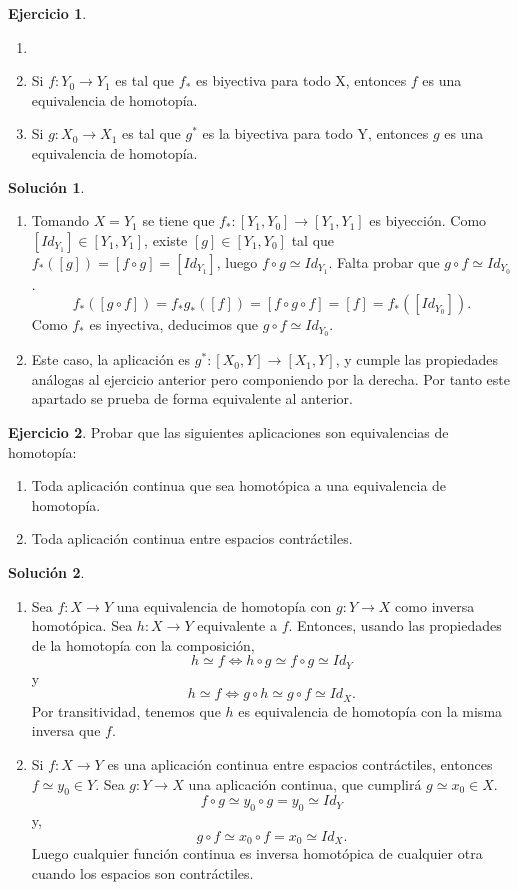\documentclass{article}
\theoremstyle{plain}
\theoremstyle{definition}
\newtheorem{exercise}{Ejercicio}
\newtheorem*{sol*}{Solución}
\begin{document}
\newpage
\begin{exercise}
\begin{enumerate}
\item[]
\item Si $f:Y_0\to Y_1$ es tal que $f_*$ es biyectiva para todo X, entonces $f$ es una equivalencia de homotopía.
\item Si $g:X_0\to X_1$ es tal que $g^*$ es la biyectiva para todo Y, entonces $g$ es una equivalencia de homotopía.
\end{enumerate}
\begin{sol*}
\begin{enumerate}\
\item Tomando $X=Y_1$ se tiene que $f_*:[Y_1,Y_0]\rightarrow[Y_1,Y_1]$ es biyección. Como $[Id_{Y_1}]\in [Y_1,Y_1]$, existe $[g]\in [Y_1,Y_0]$ tal que $f_*([g])=[f\circ g]=[Id_{Y_1}]$, luego $f\circ g\simeq Id_{Y_1}$. Falta probar que $g\circ f\simeq Id_{Y_0}$. 
\[ f_*([g\circ f])=f_*g_*([f])=[f\circ g\circ f]=[f]=f_*([Id_{Y_0}]).\]
Como $f_*$ es inyectiva, deducimos que $g\circ f\simeq Id_{Y_0}$.
\item Este caso, la aplicación es $g^*:[X_0,Y]\to [X_1,Y]$, y cumple las propiedades análogas al ejercicio anterior pero componiendo por la derecha. Por tanto este apartado se prueba de forma equivalente al anterior. 
\end{enumerate}
\end{sol*}

\end{exercise}
\newpage
\begin{exercise}
Probar que las siguientes aplicaciones son equivalencias de homotopía:
\begin{enumerate}
\item Toda aplicación continua que sea homotópica a una equivalencia de homotopía.
\item Toda aplicación continua entre espacios contráctiles.
\end{enumerate}
\end{exercise}
\begin{sol*}
\begin{enumerate}\
\item Sea $f:X\to Y$ una equivalencia de homotopía con $g:Y\to X$ como inversa homotópica. Sea $h:X\to Y$ equivalente a $f$. Entonces, usando las propiedades de la homotopía con la composición, 
\[
h\simeq f\Leftrightarrow h\circ g\simeq f\circ g\simeq Id_Y
\]
y
\[
h\simeq f\Leftrightarrow g\circ h\simeq g\circ f\simeq Id_X.
\]
Por transitividad, tenemos que $h$ es equivalencia de homotopía con la misma inversa que $f$. 
\item Si $f:X\to Y$ es una aplicación continua entre espacios contráctiles, entonces $f\simeq y_0\in Y$. Sea $g:Y\to X$ una aplicación continua, que cumplirá $g\simeq x_0\in X$. 
\[
f\circ g\simeq y_0\circ g = y_0\simeq Id_Y
\]
y,
\[
g\circ f\simeq x_0\circ f =x_0\simeq Id_X.
\]
Luego cualquier función continua es inversa homotópica de cualquier otra cuando los espacios son contráctiles. 
\end{enumerate}
\end{sol*}
\end{document}
